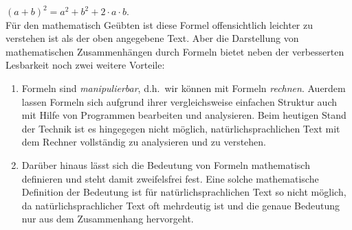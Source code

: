 \hspace*{1.3cm} $(a+b)^2 = a^2 + b^2 + 2\cdot a\cdot b$. \\[0.2cm]
F\"ur den mathematisch Ge\"ubten ist diese Formel offensichtlich leichter zu verstehen ist als
der oben angegebene Text.  Aber die Darstellung von mathematischen Zusammenh\"angen durch
Formeln bietet neben der verbesserten Lesbarkeit noch zwei weitere Vorteile:
\begin{enumerate}
\item Formeln sind \emph{manipulierbar}, d.h.~wir k\"onnen mit Formeln \emph{rechnen}.
      Au\3erdem lassen Formeln sich aufgrund ihrer vergleichsweise einfachen Struktur auch 
      mit Hilfe von Programmen bearbeiten und analysieren.  Beim heutigen Stand der Technik ist
      es hingegegen nicht m\"oglich, nat\"urlichsprachlichen Text mit dem Rechner vollst\"andig
      zu analysieren und zu verstehen.
\item Dar\"uber hinaus l\"asst sich die Bedeutung von Formeln mathematisch definieren und
      steht damit zweifelsfrei fest.  Eine solche mathematische Definition der Bedeutung
      ist f\"ur nat\"urlichsprachlichen Text so nicht m\"oglich, da
      nat\"urlichsprachlicher Text oft mehrdeutig ist und die genaue Bedeutung nur
      aus dem Zusammenhang hervorgeht.
\end{enumerate}

